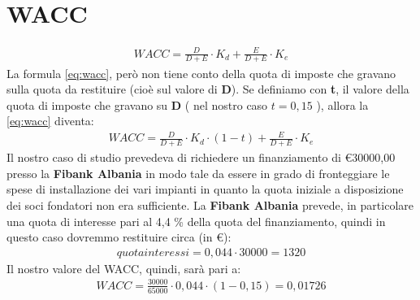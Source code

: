 \section[WACC]{WACC}
	\begin{equation}
	\label{eq:wacc}
	\begin{split}
		WACC = \frac{D}{D+E} \cdot K_d + \frac{E}{D+E} \cdot K_e 
	\end{split}
	\end{equation}
	La formula \ref{eq:wacc}, però non tiene conto della quota di imposte che gravano sulla quota da restituire (cioè sul valore di \textbf{D}). \newline Se definiamo con \textbf{t}, il valore della quota di imposte che gravano su \textbf{D} ( nel nostro caso $ t = 0,15 $ ), allora la \ref{eq:wacc} diventa:
	\begin{equation}
	\label{eq:wacc_tax}
	\begin{split}
		WACC = \frac{D}{D+E} \cdot K_d \cdot ( 1 - t ) + \frac{E}{D+E} \cdot K_e 
	\end{split}
	\end{equation}	
	Il nostro caso di studio prevedeva di richiedere un finanziamento di \euro 30000,00 presso la \textbf{\ac{Fibank Albania}} in modo tale da essere in grado di fronteggiare le spese di installazione dei vari impianti in quanto la quota iniziale a disposizione dei soci fondatori non era sufficiente.
\newline
La \textbf{\ac{Fibank Albania}} prevede, in particolare una quota di interesse pari al 4,4 \% della quota del finanziamento, quindi in questo caso dovremmo restituire circa (in \euro):
	\begin{equation}
	\label{eq:interessi_fibank}
	\begin{split}
		quota interessi = 0,044 \cdot 30000 = 1320 
	\end{split}
	\end{equation}	
Il nostro valore del \ac{WACC}, quindi, sarà pari a:
	\begin{equation}
	\label{eq:wacc_tax_value}
	\begin{split}
		WACC = \frac{30000}{65000} \cdot 0,044 \cdot ( 1 - 0,15 ) = 0,01726 
	\end{split}
	\end{equation}